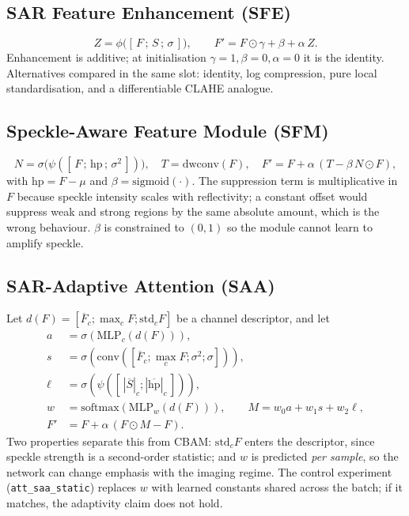 \documentclass[10pt,twocolumn,letterpaper]{article}
\begin{document}
\subsection{SAR Feature Enhancement (SFE)}
\label{sec:sfe}
\begin{equation}
Z = \phi\big([\,F \,;\, S \,;\, \sigma\,]\big),\qquad
F' = F \odot \gamma + \beta + \alpha\, Z .
\end{equation}
Enhancement is additive; at initialisation $\gamma=1,\beta=0,\alpha=0$ it is the
identity. Alternatives compared in the same slot: identity, log compression,
pure local standardisation, and a differentiable CLAHE analogue.

\subsection{Speckle-Aware Feature Module (SFM)}
\label{sec:sfm}
\begin{equation}
N = \sigma\!\big(\psi([\,F \,;\, \mathrm{hp} \,;\, \sigma^2\,])\big),\quad
T = \mathrm{dwconv}(F),\quad
F' = F + \alpha\,(T - \beta\, N \odot F),
\end{equation}
with $\mathrm{hp} = F-\mu$ and $\beta = \mathrm{sigmoid}(\cdot)$. The suppression
term is multiplicative in $F$ because speckle intensity scales with reflectivity;
a constant offset would suppress weak and strong regions by the same absolute
amount, which is the wrong behaviour. $\beta$ is constrained to $(0,1)$ so the
module cannot learn to amplify speckle.

\subsection{SAR-Adaptive Attention (SAA)}
\label{sec:saa}
Let $d(F) = [\overline{F}_c ; \max_c F ; \mathrm{std}_c F]$ be a channel
descriptor, and let
\begin{align}
a &= \sigma(\mathrm{MLP}_c(d(F))),\\
s &= \sigma(\mathrm{conv}([\overline{F}_c ; \max_c F ; \sigma^2 ; \sigma])),\\
\ell &= \sigma(\psi([\,|\overline{S}|_c ; |\overline{\mathrm{hp}}|_c\,])),\\
w &= \mathrm{softmax}(\mathrm{MLP}_w(d(F))),\qquad M = w_0 a + w_1 s + w_2 \ell,\\
F' &= F + \alpha\,(F \odot M - F).
\end{align}
Two properties separate this from CBAM: $\mathrm{std}_c F$ enters the descriptor,
since speckle strength is a second-order statistic; and $w$ is predicted
\emph{per sample}, so the network can change emphasis with the imaging regime.
The control experiment (\texttt{att\_saa\_static}) replaces $w$ with learned
constants shared across the batch; if it matches, the adaptivity claim does not
hold.
\end{document}
